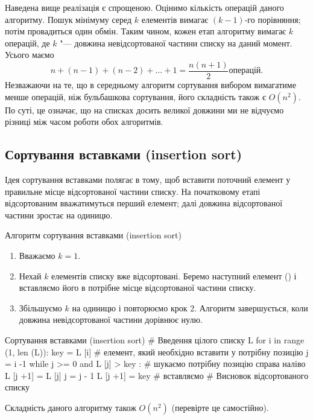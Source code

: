 Наведена вище реалізація є спрощеною. Оцінимо кількість операцій даного алгоритму. Пошук мінімуму серед $ k $ елементів вимагає $(k -1)$-го порівняння; потім провадиться один обмін. Таким чином, кожен етап алгоритму вимагає $ k $ операцій, де $ k $ "--- довжина невідсортованої частини списку на даний момент. Усього маємо
$$
n + (n -1) + (n -2) + \ldots +1 = \frac{n (n +1)}{2} \text{операцій}.
$$
Незважаючи на те, що в середньому алгоритм сортування вибором вимагатиме менше операцій, ніж бульбашкова сортування, його складність також є $ O \left (n ^ 2 \right) $. По суті, це означає, що на списках досить великої довжини ми не відчуємо різниці між часом роботи обох алгоритмів.

\subsection{Сортування вставками (insertion sort)}\label{insertion}

Ідея сортування вставками полягає в тому, щоб вставити поточний елемент у правильне місце відсортованої частини списку. На початковому етапі відсортованим вважатимуться перший елемент; далі довжина відсортованої частини зростає на одиницю.

\begin{defn}{Алгоритм сортування вставками (insertion sort)}
\begin{enumerate}
\item Вважаємо $k=1$.
\item 	Нехай $ k $ елементів списку вже відсортовані. Беремо наступний елемент () і вставляємо його в потрібне місце відсортованої частини списку.
\item 	Збільшуємо $ k $ на одиницю і повторюємо крок 2. Алгоритм завершується, коли довжина невідсортованої 	частини дорівнює нулю.
\end{enumerate}
\end{defn}

\begin{py}{Сортування вставками (insertion sort)}
# Введення цілого списку L
for i in range (1, len (L)):
    key = L [i] # елемент, який необхідно вставити у потрібну позицію
    j = i -1
    while j >= 0 and L [j] > key : # шукаємо потрібну позицію справа наліво
        L [j +1] = L [j]
        j = j - 1
    L [j +1] = key # вставляємо
# Висновок відсортованого списку
\end{py}

Складність даного алгоритму також $ O \left (n ^ 2 \right) $ (перевірте це самостійно).

